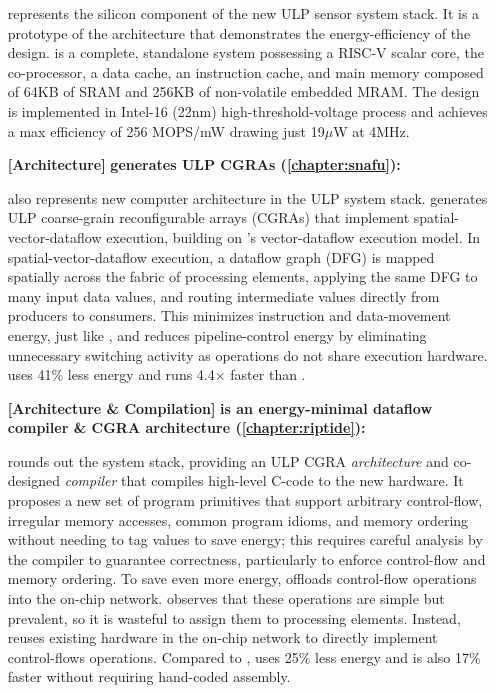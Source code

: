 \begin{itemize}
\msilicon represents the silicon component of the new ULP sensor system stack.
% 
It is a prototype of the \manic architecture that demonstrates the energy-efficiency of the design.
% 
\msilicon is a complete, standalone system possessing a RISC-V scalar core, the \manic co-processor, a data cache, an instruction cache, and main memory composed of 64KB of SRAM and 256KB of non-volatile embedded MRAM.
% 
The design is implemented in Intel-16 (22nm) high-threshold-voltage process and achieves a max efficiency of 256 MOPS/mW drawing just 19$\mu$W at 4MHz.
% 

\item[\textbf{[Architecture]}]
\textbf{\snafu generates ULP CGRAs (\autoref{chapter:snafu}): }

\snafu also represents new computer architecture in the ULP system stack.
% 
\snafu generates ULP coarse-grain reconfigurable arrays (CGRAs) that implement spatial-vector-dataflow execution, building on \manic's vector-dataflow execution model.
% 
% 
In spatial-vector-dataflow execution, a dataflow graph (DFG) is mapped spatially across the fabric of processing elements, applying the same DFG to many input data values, and routing intermediate values directly from producers to consumers.
% 
This minimizes instruction and data-movement energy, just like \manic, and reduces pipeline-control energy by eliminating unnecessary switching activity as operations do not share execution hardware.
% 
\snafu uses 41$\%$ less energy and runs 4.4$\times$ faster than \manic.
% 

\item[\textbf{[Architecture \& Compilation]}]
\textbf{\riptide is an energy-minimal dataflow compiler \& CGRA architecture (\autoref{chapter:riptide}): }

\riptide rounds out the system stack, providing an ULP CGRA \emph{architecture} and co-designed \emph{compiler} that compiles high-level C-code to the new hardware.
% 
It proposes a new set of program primitives that support arbitrary control-flow, irregular memory accesses, common program idioms, and memory ordering without needing to tag values to save energy; this requires careful analysis by the compiler to guarantee correctness, particularly to enforce control-flow and memory ordering.
% 
To save even more energy, \riptide offloads control-flow operations into the on-chip network.
% 
\riptide observes that these operations are simple but prevalent, so it is wasteful to assign them to processing elements.
% 
Instead, \riptide reuses existing hardware in the on-chip network to directly implement control-flows operations.
% 
Compared to \snafu, \riptide uses 25\% less energy and is also 17\% faster without requiring hand-coded assembly.
% 

\end{itemize}

